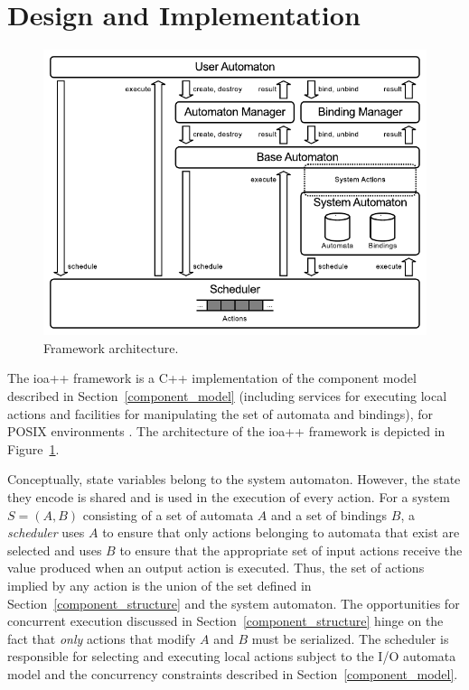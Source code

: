\section{Design and Implementation\label{design}}

\begin{figure}
\center
\includegraphics[width=\columnwidth]{architecture}
\caption{Framework architecture.}
\label{framework_architecture}
\end{figure}

The ioa++ framework is a C++ implementation of the component model described in Section~\ref{component_model} (including services for executing local actions and facilities for manipulating the set of automata and bindings), for POSIX environments .
The architecture of the ioa++ framework is depicted in Figure~\ref{framework_architecture}.

Conceptually, state variables belong to the system automaton.
However, the state they encode is shared and is used in the execution of every action.
For a system $S=(A,B)$ consisting of a set of automata $A$ and a set of bindings $B$,
a \emph{scheduler} uses $A$ to ensure that only actions belonging to automata that exist are selected and uses $B$ to ensure that the appropriate set of input actions receive the value produced when an output action is executed.
Thus, the set of actions implied by any action is the union of the set defined in Section~\ref{component_structure} and the system automaton.
The opportunities for concurrent execution discussed in Section~\ref{component_structure} hinge on the fact that \emph{only} actions that modify $A$ and $B$ must be serialized.
The scheduler is responsible for selecting and executing local actions subject to the I/O automata model and the concurrency constraints described in Section~\ref{component_model}.


